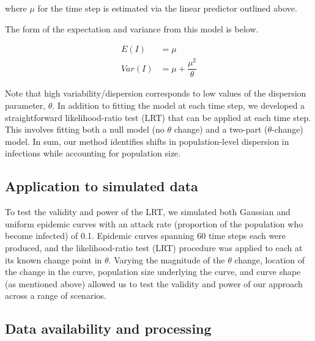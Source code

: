 \documentclass[10pt,letterpaper]{article}
\begin{document}
where \begin{math}\mu\end{math} for the time step is estimated via the linear predictor outlined above.

The form of the expectation and variance from this model is below.

\begin{align}
  E(I) &= \mu\\
  Var(I) &= \mu + \dfrac{\mu^2}{\theta}
\end{align}

Note that high variability/dispersion corresponds to low values of the dispersion parameter, \begin{math}\theta\end{math}.
In addition to fitting the model at each time step, we developed a straightforward likelihood-ratio test (LRT) that can be applied at each time step. This involves fitting both a null model (no \begin{math}\theta\end{math} change) and a two-part (\begin{math}\theta\end{math}-change) model.
In sum, our method identifies shifts in population-level dispersion in infections while accounting for population size. 

\subsection*{Application to simulated data}

To test the validity and power of the LRT, we simulated both Gaussian and uniform epidemic curves with an attack rate (proportion of the population who become infected) of 0.1. Epidemic curves spanning 60 time steps each were produced, and the likelihood-ratio test (LRT) procedure was applied to each at its known change point in \begin{math}\theta\end{math}. 
Varying the magnitude of the \begin{math}\theta\end{math} change, location of the change in the curve, population size underlying the curve, and curve shape (as mentioned above) allowed us to test the validity and power of our approach across a range of scenarios.

\subsection*{Data availability and processing}
\end{document}
